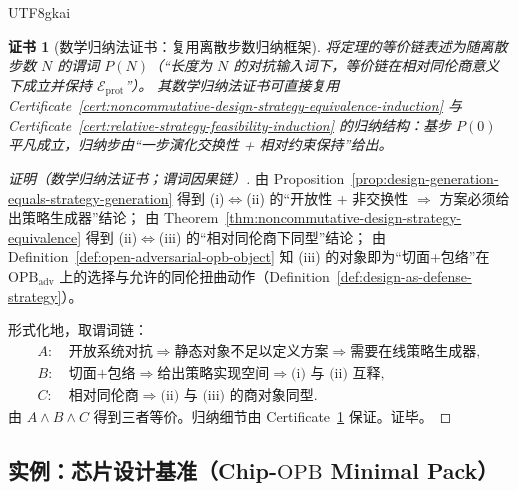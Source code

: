 \documentclass[12pt]{article}
\newtheorem{certificate}{证书}[section]
\newcommand{\OPB}{\ensuremath{\mathrm{OPB}}}
\begin{document}
\begin{CJK*}{UTF8}{gkai}
\begin{certificate}[数学归纳法证书：复用离散步数归纳框架]
\label{cert:opb-benchmark-template-induction}
将定理的等价链表述为随离散步数 $N$ 的谓词 $P(N)$（“长度为 $N$ 的对抗输入词下，等价链在相对同伦商意义下成立并保持 $\mathcal{E}_{\mathrm{prot}}$”）。
其数学归纳法证书可直接复用 Certificate~\ref{cert:noncommutative-design-strategy-equivalence-induction} 与
Certificate~\ref{cert:relative-strategy-feasibility-induction} 的归纳结构：基步 $P(0)$ 平凡成立，归纳步由“一步演化交换性 + 相对约束保持”给出。
\end{certificate}

\begin{proof}[证明（数学归纳法证书；谓词因果链）]
由 Proposition~\ref{prop:design-generation-equals-strategy-generation} 得到 (i)$\Longleftrightarrow$(ii) 的“开放性 + 非交换性
  $\Rightarrow$ 方案必须给出策略生成器”结论；
由 Theorem~\ref{thm:noncommutative-design-strategy-equivalence} 得到 (ii)$\Longleftrightarrow$(iii) 的“相对同伦商下同型”结论；
由 Definition~\ref{def:open-adversarial-opb-object} 知 (iii) 的对象即为“切面+包络”在 $\OPB_{\mathrm{adv}}$
  上的选择与允许的同伦扭曲动作（Definition~\ref{def:design-as-defense-strategy}）。

形式化地，取谓词链：
\[
\begin{aligned}
A:&\ \text{开放系统对抗}\Rightarrow \text{静态对象不足以定义方案}\Rightarrow \text{需要在线策略生成器},\\
B:&\ \text{切面+包络}\Rightarrow \text{给出策略实现空间}\Rightarrow \text{(i) 与 (ii) 互释},\\
C:&\ \text{相对同伦商}\Rightarrow \text{(ii) 与 (iii) 的商对象同型}.
\end{aligned}
\]
由 $A\wedge B\wedge C$ 得到三者等价。归纳细节由 Certificate~\ref{cert:opb-benchmark-template-induction} 保证。证毕。
\end{proof}

\subsection{实例：芯片设计基准（Chip-\OPB{} Minimal Pack）}


\end{CJK*}
\end{document}

